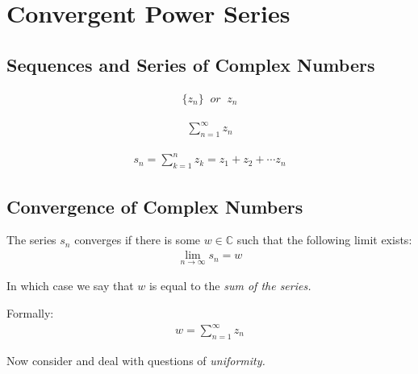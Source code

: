 \section{Convergent Power Series}

\subsection{Sequences and Series of Complex Numbers}

\begin{defn}
  \begin{align*}
    { \{ z_n \} } \;\; or \;\; z_n
  \end{align*}
\end{defn}

\begin{defn}
  \begin{align*}
    \sum_{n = 1}^{\infty} z_n
  \end{align*}
\end{defn}

\begin{defn}
  \begin{align*}
    s_n = \sum_{k = 1}^{n} z_k = z_1 + z_2 + \cdots z_n
  \end{align*}
\end{defn}

\subsection{Convergence of Complex Numbers}
\begin{defn}
  The series $s_n$ converges if there is some $w \in \mathbb{C}$ such that the following limit exists:
  \begin{align*}
    \lim_{n \to \infty}s_n = w
  \end{align*}
\end{defn}

In which case we say that $w$ is equal to the \emph{sum of the series.}

\begin{defn}
  Formally:
  \begin{align*}
    w = \sum_{n = 1}^{\infty} z_n
  \end{align*}
\end{defn}

Now consider \emph{} and deal with questions of \emph{uniformity.}

